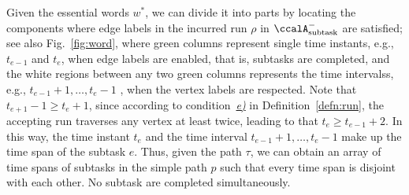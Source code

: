 \documentclass[Afour,sageh,times]{sagej}
\newcommand{\auto}[1]{\ccalA_{\textup{#1}}}
\begin{document}
{{{Given the essential words $w^*$, we can divide it into parts by locating the components where edge labels in the incurred run $\rho$ in $\auto{subtask}^-$ are satisfied; see also Fig.~\ref{fig:word}, where green columns represent single time instants, e.g., $t_{e-1}$ and $t_{e}$, when edge labels are enabled, that is, subtasks are completed, and the white regions between any two green columns represents the time intervalss, e.g., $t_{e-1}+1, \ldots, t_{e}-1$ , when the vertex labels are respected. Note that $t_{e+1}-1 \geq t_e+1$, since according to condition~\hyperref[cond:e]{\it e)} in Definition~\ref{defn:run}, the accepting run traverses any vertex at least twice, leading to that $t_{e} \geq t_{e-1}+2$. In this way, the time instant $t_e$ and the time interval $t_{e-1}+1, \ldots, t_{e}-1$ make up the time span of the  subtask $e$. Thus, given the path $\tau$, we can obtain an array of time spans of subtasks in the simple path $p$ such that every time span is disjoint with each other. No subtask are completed simultaneously.

}}}
\end{document}
